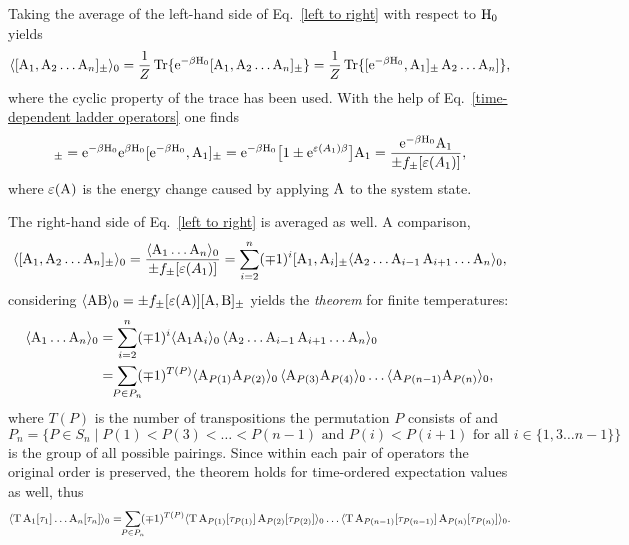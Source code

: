 Taking the average of the left-hand side of Eq.~\ref{left to right} with respect
to $\mathrm H_0$ yields
%
\begin{equation*}
    \langle[\mathrm A_1, \mathrm A_2 \dots \mathrm A_n]_\pm\rangle_0
    = \frac 1 Z \operatorname{Tr} \{
    \mathrm e^{-\beta \mathrm H_0} [ \mathrm A_1, \mathrm A_2 \dots \mathrm A_n ]_\pm \}
    = \frac 1 Z \operatorname{Tr} \{
    [\mathrm e^{-\beta \mathrm H_0}, \mathrm A_1]_\pm \, \mathrm A_2 \dots \mathrm A_n] \},
\end{equation*}
%
where the cyclic property of the trace has been used. With the help of
Eq.~\ref{time-dependent ladder operators} one finds
%
\begin{equation*}
	[\E^{-\beta \op H_0}, \op A_1]_\pm
    = \E^{-\beta \op H_0} \E^{\beta \op H_0} [\E^{-\beta \op H_0}, \op A_1]_\pm
    = \E^{-\beta \op H_0} \big[
        1 \pm \E^{\epsilon(A_1) \beta}
    \big] \op A_1
    = \frac{\E^{-\beta \op H_0} \op A_1}{\pm f_\pm[\epsilon(A_1)]},
\end{equation*}
%
where $\varepsilon(\mathrm A)$ is the energy change caused by applying $\mathrm A$ to the
system state.

The right-hand side of Eq.~\ref{left to right} is averaged as well. A
comparison,
%
\begin{equation*}
    \langle[\mathrm A_1, \mathrm A_2 \dots \mathrm A_n]_\pm\rangle_0
    = \frac{\langle\mathrm A_1 \dots \mathrm A_n\rangle_0}{\pm f_\pm[\varepsilon(A_1)]}
    = \sum_{i = 2}^n (\mp 1)^i [\mathrm A_1, \mathrm A_i]_\pm
    \langle\mathrm A_2 \dots \mathrm A_{i - 1} \, \mathrm A_{i + 1} \dots \mathrm A_n\rangle_0,
\end{equation*}
%
considering $\langle\mathrm A \mathrm B\rangle_0 = \pm f_\pm[\varepsilon(\mathrm A)] [\mathrm A,
\mathrm B]_\pm$ yields the \emph{ theorem} for finite temperatures:
%
\begin{align*}
    \av{\op A_1 \dots \op A_n}_0 &=
    \sum_{i = 2}^n (\mp 1)^i \av{\op A_1 \op A_i}_0 \,
    \av{\op A_2 \dots \op A_{i - 1} \, \op A_{i + 1} \dots \op A_n}_0 \\
    &= \sum_{\mathclap{P \in P_n}} (\mp 1)^{T(P)}
    \av{\op A_{P(1)} \op A_{P(2)}}_0 \,
    \av{\op A_{P(3)} \op A_{P(4)}}_0 \dots
    \av{\op A_{P(n - 1)} \op A_{P(n)}}_0,
\end{align*}
%
where $T(P)$ is the number of transpositions the permutation $P$ consists of and
%
\begin{equation*}
    P_n = \{ P \in S_n \mid
        P(1) < P(3) < \dots < P(n - 1)
        \text{ and }
        P(i) < P(i + 1) \text{ for all $i \in \{1, 3 \dots n - 1\}$}
        \}
\end{equation*}
%
is the group of all possible pairings. Since within each pair of operators the
original order is preserved, the theorem holds for time-ordered expectation
values as well, thus
%
\begin{align*}
    \av{\op T \, \op A_1[\tau_1] \dots \op A_n[\tau_n]}_0 =
    \sum_{\mathclap{P \in P_n}} (\mp 1)^{T(P)}
    \av{\op T \, \op A_{P(1)}[\tau_{P(1)}] \,
    \op A_{P(2)}[\tau_{P(2)}]}_0 \dots
    \av{\op T \, \op A_{P(n - 1)}[\tau_{P(n - 1)}] \,
    \op A_{P(n)}[\tau_{P(n)}]}_0.
\end{align*}
